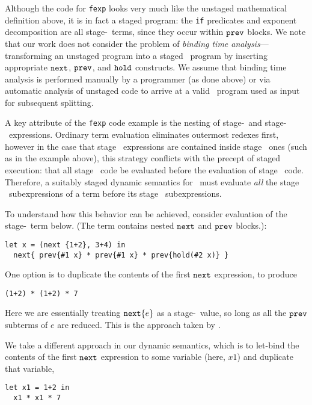 Although the code for {\tt fexp} looks very much like the unstaged mathematical
definition above, it is in fact a staged program: the {\tt if} predicates and exponent
decomposition are all stage-\bbone\ terms, since they occur within ${\tt prev}$ blocks.
We note that our work does not consider the problem of {\em binding time analysis}---transforming an unstaged program into a staged \lang\ program by inserting appropriate ${\tt next}$, ${\tt prev}$, and ${\tt hold}$ constructs. We assume that binding time analysis is performed manually by a programmer (as done above) or via automatic analysis of unstaged code to arrive at a valid \lang\ program used as input for subsequent splitting.


A key attribute of the {\tt fexp} code example is the nesting of stage-\bbone\ and stage-\bbtwo\ expressions. Ordinary term evaluation eliminates outermost redexes first, 
however in the case that stage \bbone\ expressions are contained inside
stage \bbtwo\ ones (such as in the example above), this strategy conflicts with the precept of staged execution: that all stage \bbone\ code be evaluated before the evaluation of stage \bbtwo\ code. Therefore, a suitably staged dynamic semantics for \lang\ must evaluate
\emph{all} the stage \bbone\ subexpressions of a term before its stage
\bbtwo\ subexpressions.

To understand how this behavior can be achieved, consider evaluation of the stage-\bbone\ term below. (The term contains nested ${\tt next}$ and ${\tt prev}$ blocks.):
\begin{lstlisting} 
let x = (next {1+2}, 3+4) in
  next{ prev{#1 x} * prev{#1 x} * prev{hold(#2 x)} }
\end{lstlisting}
One option is to duplicate the contents of the first ${\tt next}$ expression, to produce
\begin{lstlisting}
(1+2) * (1+2) * 7
\end{lstlisting}

Here we are essentially treating ${\tt next}\{e\}$ as a stage-\bbone\ value, so long
as all the ${\tt prev}$ subterms of $e$ are reduced. This is the approach taken by
\cite{davies96}.

We take a different approach in our dynamic semantics, which is to let-bind the
contents of the first ${\tt next}$ expression to some variable (here, $x1$) and
duplicate that variable,
\begin{lstlisting} 
let x1 = 1+2 in
  x1 * x1 * 7
\end{lstlisting}

